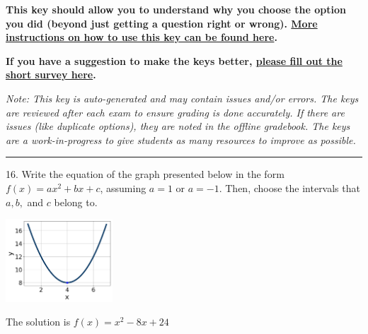 \documentclass{extbook}[14pt]
\begin{document}
\textbf{This key should allow you to understand why you choose the option you did (beyond just getting a question right or wrong). \href{https://xronos.clas.ufl.edu/mac1105spring2020/courseDescriptionAndMisc/Exams/LearningFromResults}{More instructions on how to use this key can be found here}.}

\textbf{If you have a suggestion to make the keys better, \href{https://forms.gle/CZkbZmPbC9XALEE88}{please fill out the short survey here}.}

\textit{Note: This key is auto-generated and may contain issues and/or errors. The keys are reviewed after each exam to ensure grading is done accurately. If there are issues (like duplicate options), they are noted in the offline gradebook. The keys are a work-in-progress to give students as many resources to improve as possible.}

\rule{\textwidth}{0.4pt}

16. Write the equation of the graph presented below in the form $f(x)=ax^2+bx+c$, assuming  $a=1$ or $a=-1$. Then, choose the intervals that $a, b,$ and $c$ belong to.
\begin{center} \includegraphics[width=0.3\textwidth]{../Figures/quadraticGraphToEquationB.png} \end{center} 

The solution is $ f(x) = x^{2} -8 x + 24 $ 
\end{document}
